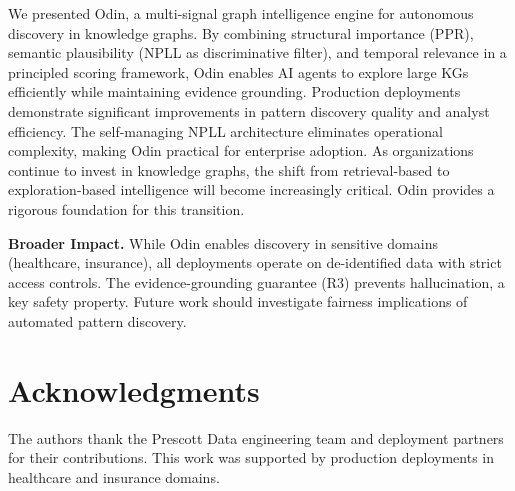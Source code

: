 \documentclass[10pt,twocolumn]{article}
\begin{document}
We presented Odin, a multi-signal graph intelligence engine for autonomous discovery in knowledge graphs. By combining structural importance (PPR), semantic plausibility (NPLL as discriminative filter), and temporal relevance in a principled scoring framework, Odin enables AI agents to explore large KGs efficiently while maintaining evidence grounding. Production deployments demonstrate significant improvements in pattern discovery quality and analyst efficiency. The self-managing NPLL architecture eliminates operational complexity, making Odin practical for enterprise adoption. As organizations continue to invest in knowledge graphs, the shift from retrieval-based to exploration-based intelligence will become increasingly critical. Odin provides a rigorous foundation for this transition.

\textbf{Broader Impact.} While Odin enables discovery in sensitive domains (healthcare, insurance), all deployments operate on de-identified data with strict access controls. The evidence-grounding guarantee (R3) prevents hallucination, a key safety property. Future work should investigate fairness implications of automated pattern discovery.

\section*{Acknowledgments}

The authors thank the Prescott Data engineering team and deployment partners for their contributions. This work was supported by production deployments in healthcare and insurance domains.

\balance
\end{document}
